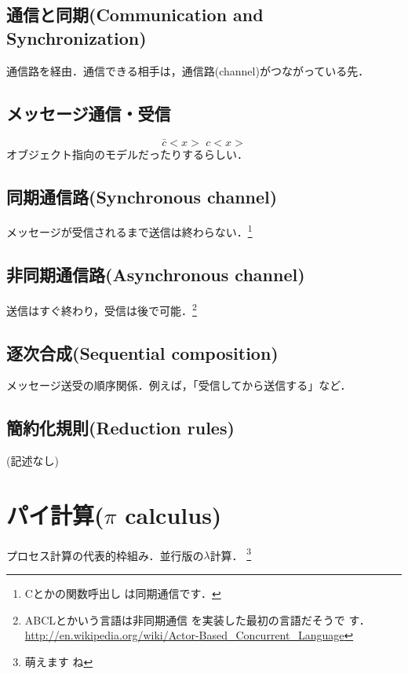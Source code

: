 \subsection{通信と同期(Communication and Synchronization)}
通信路を経由．通信できる相手は，通信路(channel)がつながっている先．

\subsection{メッセージ通信・受信}
\[
 \bar{c}<x> \,\, c<x>
\]
オブジェクト指向のモデルだったりするらしい．

\subsection{同期通信路(Synchronous channel)}
メッセージが受信されるまで送信は終わらない．\footnote{Cとかの関数呼出し
は同期通信です．}

\subsection{非同期通信路(Asynchronous channel)}
送信はすぐ終わり，受信は後で可能．\footnote{ABCLとかいう言語は非同期通信
を実装した最初の言語だそうで
す．\url{http://en.wikipedia.org/wiki/Actor-Based_Concurrent_Language}}

\subsection{逐次合成(Sequential composition)}
メッセージ送受の順序関係．例えば，「受信してから送信する」など．

\subsection{簡約化規則(Reduction rules)}
(記述なし)


\section{パイ計算($\pi$ calculus)}
プロセス計算の代表的枠組み．並行版の$\lambda$計算． \footnote{萌えます
ね}


